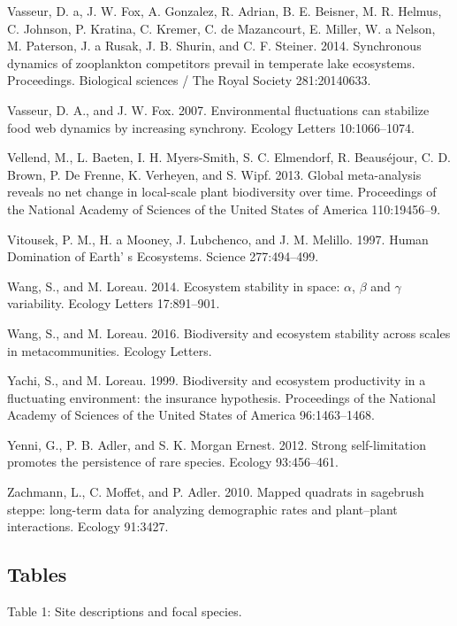 \documentclass[12pt,]{article}
\begin{document}
Vasseur, D. a, J. W. Fox, A. Gonzalez, R. Adrian, B. E. Beisner, M. R.
Helmus, C. Johnson, P. Kratina, C. Kremer, C. de Mazancourt, E. Miller,
W. a Nelson, M. Paterson, J. a Rusak, J. B. Shurin, and C. F. Steiner.
2014. Synchronous dynamics of zooplankton competitors prevail in
temperate lake ecosystems. Proceedings. Biological sciences / The Royal
Society 281:20140633.

Vasseur, D. A., and J. W. Fox. 2007. Environmental fluctuations can
stabilize food web dynamics by increasing synchrony. Ecology Letters
10:1066--1074.

Vellend, M., L. Baeten, I. H. Myers-Smith, S. C. Elmendorf, R.
Beaus{é}jour, C. D. Brown, P. {De Frenne}, K. Verheyen, and S. Wipf.
2013. Global meta-analysis reveals no net change in local-scale plant
biodiversity over time. Proceedings of the National Academy of Sciences
of the United States of America 110:19456--9.

Vitousek, P. M., H. a Mooney, J. Lubchenco, and J. M. Melillo. 1997.
Human Domination of Earth' s Ecosystems. Science 277:494--499.

Wang, S., and M. Loreau. 2014. Ecosystem stability in space: \(\alpha\),
\(\beta\) and \(\gamma\) variability. Ecology Letters 17:891--901.

Wang, S., and M. Loreau. 2016. Biodiversity and ecosystem stability
across scales in metacommunities. Ecology Letters.

Yachi, S., and M. Loreau. 1999. Biodiversity and ecosystem productivity
in a fluctuating environment: the insurance hypothesis. Proceedings of
the National Academy of Sciences of the United States of America
96:1463--1468.

Yenni, G., P. B. Adler, and S. K. {Morgan Ernest}. 2012. Strong
self-limitation promotes the persistence of rare species. Ecology
93:456--461.

Zachmann, L., C. Moffet, and P. Adler. 2010. Mapped quadrats in
sagebrush steppe: long-term data for analyzing demographic rates and
plant--plant interactions. Ecology 91:3427.

\newpage{}

\subsection{Tables}\label{tables}

\singlespacing

Table 1: Site descriptions and focal species. \footnotesize
\end{document}
